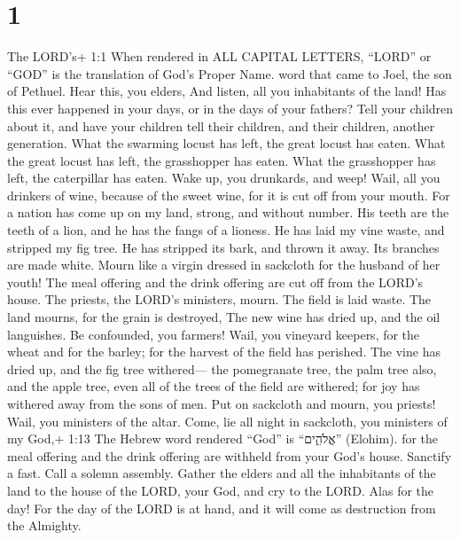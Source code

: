\hypertarget{section}{%
\section{1}\label{section}}

 The LORD's+ 1:1 When rendered in ALL CAPITAL LETTERS,
``LORD'' or ``GOD'' is the translation of God's Proper Name. word that
came to Joel, the son of Pethuel.  Hear this, you elders,
And listen, all you inhabitants of the land! Has this ever happened in
your days, or in the days of your fathers?  Tell your
children about it, and have your children tell their children, and their
children, another generation.  What the swarming locust has
left, the great locust has eaten. What the great locust has left, the
grasshopper has eaten. What the grasshopper has left, the caterpillar
has eaten.  Wake up, you drunkards, and weep! Wail, all you
drinkers of wine, because of the sweet wine, for it is cut off from your
mouth.  For a nation has come up on my land, strong, and
without number. His teeth are the teeth of a lion, and he has the fangs
of a lioness.  He has laid my vine waste, and stripped my
fig tree. He has stripped its bark, and thrown it away. Its branches are
made white.  Mourn like a virgin dressed in sackcloth for
the husband of her youth!  The meal offering and the drink
offering are cut off from the LORD's house. The priests, the LORD's
ministers, mourn.  The field is laid waste. The land
mourns, for the grain is destroyed, The new wine has dried up, and the
oil languishes.  Be confounded, you farmers! Wail, you
vineyard keepers, for the wheat and for the barley; for the harvest of
the field has perished.  The vine has dried up, and the fig
tree withered--- the pomegranate tree, the palm tree also, and the apple
tree, even all of the trees of the field are withered; for joy has
withered away from the sons of men.  Put on sackcloth and
mourn, you priests! Wail, you ministers of the altar. Come, lie all
night in sackcloth, you ministers of my God,+ 1:13 The Hebrew word
rendered ``God'' is ``אֱלֹהִ֑ים'' (Elohim). for the meal offering and
the drink offering are withheld from your God's house. 
Sanctify a fast. Call a solemn assembly. Gather the elders and all the
inhabitants of the land to the house of the LORD, your God, and cry to
the LORD.  Alas for the day! For the day of the LORD is at
hand, and it will come as destruction from the Almighty. 
